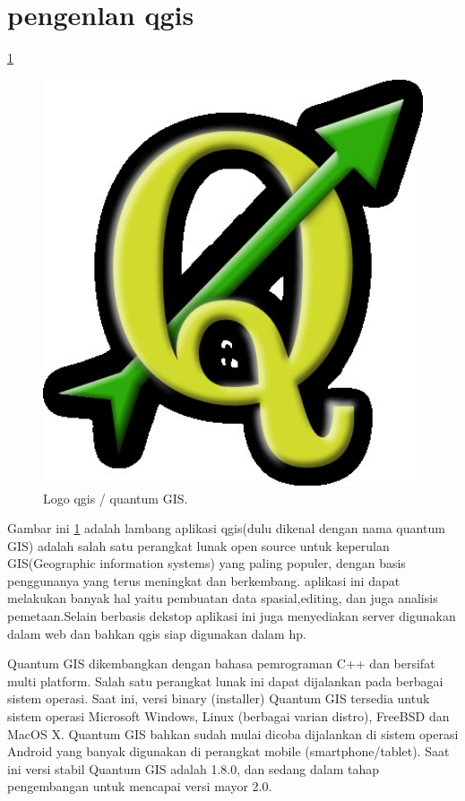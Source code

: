 
\section{pengenlan qgis}
	\ref{qgis_logo}
	\begin{figure}[ht]
	\centerline{\includegraphics[width=1\textwidth]{figures/qgis_logo.JPG}}
	\caption{Logo qgis / quantum GIS.}
	\label{qgis_logo}
	\end{figure}
		Gambar ini \ref{qgis_logo} adalah lambang aplikasi qgis(dulu dikenal dengan nama quantum GIS) adalah salah satu perangkat lunak open source untuk keperulan GIS(Geographic information systems) yang paling populer, dengan basis penggunanya yang terus meningkat dan berkembang.
	 aplikasi ini dapat melakukan banyak hal yaitu pembuatan data spasial,editing, dan juga analisis pemetaan.Selain berbasis dekstop aplikasi ini juga menyediakan server digunakan dalam web dan bahkan qgis siap digunakan dalam hp.

	Quantum GIS dikembangkan dengan bahasa pemrograman C++ dan bersifat multi platform. Salah satu perangkat lunak ini dapat dijalankan pada berbagai sistem operasi. Saat ini, versi binary (installer) Quantum GIS tersedia untuk sistem operasi Microsoft Windows, Linux (berbagai varian distro), FreeBSD dan MacOS X. Quantum GIS bahkan sudah mulai dicoba dijalankan di sistem operasi Android yang banyak digunakan di perangkat mobile (smartphone/tablet). Saat ini versi stabil Quantum GIS adalah 1.8.0, dan sedang dalam tahap pengembangan untuk mencapai versi mayor 2.0.


